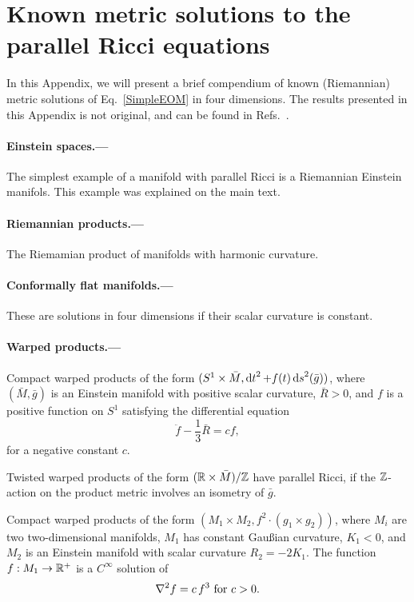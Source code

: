\section{\label{Known}Known metric solutions to the parallel Ricci equations}

In this Appendix, we will present a brief compendium of known (Riemannian) metric solutions of Eq.~\eqref{SimpleEOM} in four dimensions. The results presented in this Appendix is not original, and can be found in Refs.~\cite{gray1978einstein,derdzinski1980classification,derdzinski1982compact,Derdzinski:1985,Besse}.

\paragraph{Einstein spaces.---} The simplest example of a manifold with parallel Ricci is a Riemannian Einstein manifols. This example was explained on the main text.

\paragraph{Riemannian products.---} The Riemamian product of manifolds with harmonic curvature.

\paragraph{Conformally flat manifolds.---} These are solutions in four dimensions if their scalar curvature is constant.


\paragraph{Warped products.---} Compact warped products of the form \mbox{$(S^1 \times \bar{M}, \mathop{\mathrm{d}t}\nolimits^2 + f(t) \mathop{\mathrm{d}s}\nolimits^2(\bar{g}) )$,} where $(\bar{M}, \bar{g})$ is an Einstein manifold with positive scalar curvature, $\bar{R} > 0$, and $f$ is a positive function on $S^1$ satisfying the differential equation
\begin{equation}
  \ddot{f} - \frac{1}{3} \bar{R} = c f,
\end{equation}
for a negative constant $c$.

{Twisted} warped products of the form $(\mathbb{R} \times \bar{M} ) / \mathbb{Z}$ have parallel Ricci, if the $\mathbb{Z}$-action on the product metric involves an isometry of $\bar{g}$.

Compact warped products of the form \mbox{$(M_1 \times M_2, f^{2} \cdot (g_1 \times g_2) )$,} where $M_i$ are two two-dimensional manifolds, $M_1$ has constant Gau\ss{}ian curvature, $K_1 < 0$, and $M_2$ is an Einstein manifold with scalar curvature $R_2 = - 2 K_1$. The function $f: M_1 \to \mathbb{R}^+$ is a $C^\infty$ solution of 
\begin{equation*}
  \nabla^2 f = c \, f^3 \text{ for } c > 0.
\end{equation*}


